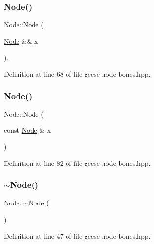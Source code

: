 \subsubsection{\texorpdfstring{Node()}{Node()}\hspace{0.1cm}{\footnotesize\ttfamily [4/5]}}
{\footnotesize\ttfamily Node\+::\+Node (\begin{DoxyParamCaption}\item[{\hyperlink{class_node}{Node} \&\&}]{x }\end{DoxyParamCaption})\hspace{0.3cm}{\ttfamily [inline]}, {\ttfamily [noexcept]}}



Definition at line 68 of file geese-\/node-\/bones.\+hpp.

\mbox{\label{class_node_ac9e4a04860b442c2034e24aa058db129}} 
\subsubsection{\texorpdfstring{Node()}{Node()}\hspace{0.1cm}{\footnotesize\ttfamily [5/5]}}
{\footnotesize\ttfamily Node\+::\+Node (\begin{DoxyParamCaption}\item[{const \hyperlink{class_node}{Node} \&}]{x }\end{DoxyParamCaption})\hspace{0.3cm}{\ttfamily [inline]}}



Definition at line 82 of file geese-\/node-\/bones.\+hpp.

\mbox{\label{class_node_aa0840c3cb5c7159be6d992adecd2097c}} 
\subsubsection{\texorpdfstring{$\sim$\+Node()}{~Node()}}
{\footnotesize\ttfamily Node\+::$\sim$\+Node (\begin{DoxyParamCaption}{ }\end{DoxyParamCaption})\hspace{0.3cm}{\ttfamily [inline]}}



Definition at line 47 of file geese-\/node-\/bones.\+hpp.



